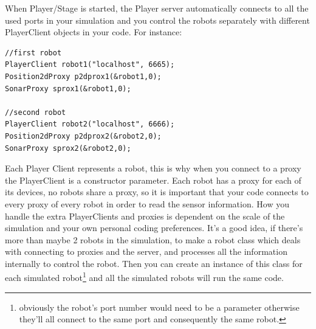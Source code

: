 \documentclass[a4paper]{report}
\newcommand{\plst}{Player/Stage\xspace}
\newcommand{\pl}{Player\xspace}
\begin{document}
When \plst is started, the \pl server automatically connects to all the used ports in your simulation and you control the robots separately with different PlayerClient objects in your code. For instance:
\begin{verbatim}
//first robot
PlayerClient robot1("localhost", 6665);
Position2dProxy p2dprox1(&robot1,0);
SonarProxy sprox1(&robot1,0);

//second robot
PlayerClient robot2("localhost", 6666);
Position2dProxy p2dprox2(&robot2,0);
SonarProxy sprox2(&robot2,0);
\end{verbatim}
Each \pl Client represents a robot, this is why when you connect to a proxy the PlayerClient is a constructor parameter. Each robot has a proxy for each of its devices, no robots share a proxy, so it is important that your code connects to every proxy of every robot in order to read the sensor information.
How you handle the extra PlayerClients and proxies is dependent on the scale of the simulation and your own personal coding preferences. It's a good idea, if there's more than maybe 2 robots in the simulation, to make a robot class which deals with connecting to proxies and the server, and processes all the information internally to control the robot. Then you can create an instance of this class for each simulated robot\footnote{obviously the robot's port number would need to be a parameter otherwise they'll all connect to the same port and consequently the same robot.} and all the simulated robots will run the same code.
\end{document}
